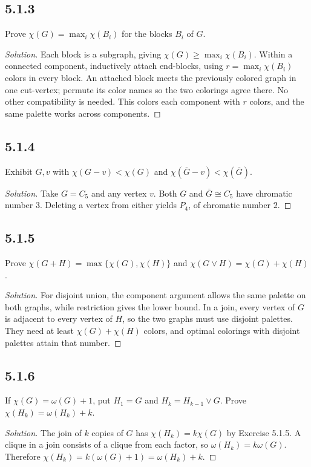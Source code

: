 \documentclass[12pt]{amsart}
\newenvironment{solution}{\begin{proof}[Solution]}{\end{proof}}
\begin{document}
    \subsection*{5.1.3} Prove $\chi(G)=\max_i\chi(B_i)$ for the blocks $B_i$ of $G$.
    \begin{solution}Each block is a subgraph, giving $\chi(G)\ge\max_i\chi(B_i)$. Within a connected component, inductively attach end-blocks, using $r=\max_i\chi(B_i)$ colors in every block. An attached block meets the previously colored graph in one cut-vertex; permute its color names so the two colorings agree there. No other compatibility is needed. This colors each component with $r$ colors, and the same palette works across components.\end{solution}

    \subsection*{5.1.4} Exhibit $G,v$ with $\chi(G-v)<\chi(G)$ and $\chi(\overline G-v)<\chi(\overline G)$.
    \begin{solution}Take $G=C_5$ and any vertex $v$. Both $G$ and $\overline G\cong C_5$ have chromatic number $3$. Deleting a vertex from either yields $P_4$, of chromatic number $2$.\end{solution}

    \subsection*{5.1.5} Prove $\chi(G+H)=\max\{\chi(G),\chi(H)\}$ and $\chi(G\vee H)=\chi(G)+\chi(H)$.
    \begin{solution}For disjoint union, the component argument allows the same palette on both graphs, while restriction gives the lower bound. In a join, every vertex of $G$ is adjacent to every vertex of $H$, so the two graphs must use disjoint palettes. They need at least $\chi(G)+\chi(H)$ colors, and optimal colorings with disjoint palettes attain that number.\end{solution}

    \subsection*{5.1.6} If $\chi(G)=\omega(G)+1$, put $H_1=G$ and $H_k=H_{k-1}\vee G$. Prove $\chi(H_k)=\omega(H_k)+k$.
    \begin{solution}The join of $k$ copies of $G$ has $\chi(H_k)=k\chi(G)$ by Exercise 5.1.5. A clique in a join consists of a clique from each factor, so $\omega(H_k)=k\omega(G)$. Therefore $\chi(H_k)=k(\omega(G)+1)=\omega(H_k)+k$.\end{solution}
\end{document}
